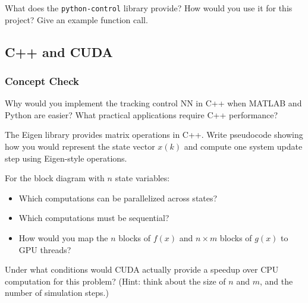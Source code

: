 What does the \texttt{python-control} library provide? How would you use it for this project? Give an example function call.

\begin{answerbox}\end{answerbox}

\subsection{C++ and CUDA}

\subsubsection*{Concept Check}

Why would you implement the tracking control NN in C++ when MATLAB and Python are easier? What practical applications require C++ performance?

\begin{answerbox}\end{answerbox}

The Eigen library provides matrix operations in C++. Write pseudocode showing how you would represent the state vector $x(k)$ and compute one system update step using Eigen-style operations.

\begin{codeanswer}\end{codeanswer}

For the block diagram with $n$ state variables:
\begin{itemize}[nosep]
  \item Which computations can be parallelized across states?
  \item Which computations must be sequential?
  \item How would you map the $n$ blocks of $f(x)$ and $n \times m$ blocks of $g(x)$ to GPU threads?
\end{itemize}

\begin{answerbox}\end{answerbox}

Under what conditions would CUDA actually provide a speedup over CPU computation for this problem? (Hint: think about the size of $n$ and $m$, and the number of simulation steps.)

